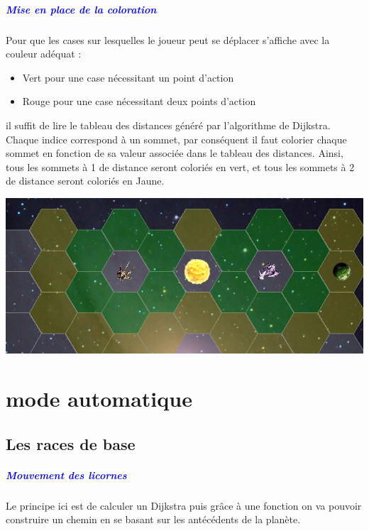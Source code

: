\documentclass{report}
\begin{document}
			\paragraph{\textcolor{blue}{Mise en place de la coloration}}
			Pour que les cases sur lesquelles le joueur peut se déplacer s'affiche avec la couleur adéquat : 
			\begin{itemize}
				\item Vert pour une case nécessitant un point d'action
				\item Rouge pour une case nécessitant deux points d'action
			\end{itemize}
			il suffit de lire le tableau des distances généré par l'algorithme de Dijkstra. Chaque indice correspond à un sommet, par conséquent il faut colorier chaque sommet en fonction de sa valeur associée dans le tableau des distances. Ainsi, tous les sommets à 1 de distance seront coloriés en vert, et tous les sommets à 2 de distance seront coloriés en Jaune.
			\begin{center} 
      
          \includegraphics[scale=0.30]{Images/colarationMouvement.png} 
     
      \end{center}
			
			
			
	\chapter{mode automatique}
		\section{Les races de base}
			\paragraph{\textcolor{blue}{Mouvement des licornes}}
			Le principe ici est de calculer un Dijkstra puis grâce à une fonction on va pouvoir construire un chemin en se basant sur les antécédents de la planète.
\end{document}
